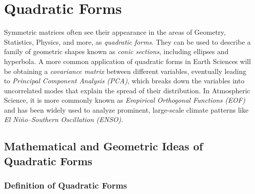 \chapter{Quadratic Forms}

Symmetric matrices often see their appearance in the areas of Geometry, Statistics, Physics, and more, as \textit{quadratic forms}. They can be used to describe a family of geometric shapes known as \textit{conic sections}, including ellipses and hyperbola. A more common application of quadratic forms in Earth Sciences will be obtaining a \textit{covariance matrix} between different variables, eventually leading to \textit{Principal Component Analysis (PCA)}, which breaks down the variables into uncorrelated modes that explain the spread of their distribution. In Atmospheric Science, it is more commonly known as \textit{Empirical Orthogonal Functions (EOF)} and has been widely used to analyze prominent, large-scale climate patterns like \textit{El Niño–Southern Oscillation (ENSO)}. 

\section{Mathematical and Geometric Ideas of Quadratic Forms}
\subsection{Definition of Quadratic Forms}

